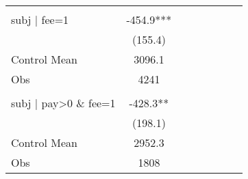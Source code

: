 \begin{tabular}{lccccccr}
\midrule
\midrule
      &       &       &       &       &       &       &  \\
subj | fee=1 & -454.9*** &       &       &       &       &       &  \\
      & (155.4) &       &       &       &       &       &  \\
Control Mean & 3096.1 &       &       &       &       &       &  \\
Obs   & 4241  &       &       &       &       &       &  \\
\midrule
\midrule
      &       &       &       &       &       &       &  \\
subj | pay>0 \& fee=1 & -428.3** &       &       &       &       &       &  \\
      & (198.1) &       &       &       &       &       &  \\
Control Mean & 2952.3 &       &       &       &       &       &  \\
Obs   & 1808  &       &       &       &       &       &  \\
\bottomrule
\bottomrule
\end{tabular}%
